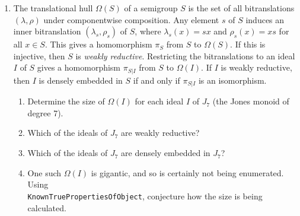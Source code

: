 \documentclass{article}
\begin{document}
\begin{enumerate}
    \item
      The translational hull $\Omega(S)$ of a semigroup $S$ is the set of all bitranslations $(\lambda, \rho)$
      under componentwise composition. Any element $s$ of $S$ induces an inner bitranslation $(\lambda_s, \rho_s)$ of $S$, where
      $\lambda_s(x) = sx$ and $\rho_s(x) = xs$ for all $x \in S$.
      This gives a homomorphism $\pi_S$ from $S$ to $\Omega(S)$. If this is injective, then $S$ is \emph{weakly reductive}.
      Restricting the bitranslations to an ideal $I$ of $S$ gives a homomorphism $\pi_{S|I}$ from $S$ to $\Omega(I)$.
      If $I$ is weakly reductive, then $I$ is densely embedded in $S$ if and only if $\pi_{S|I}$ is an isomorphism.

      \begin{enumerate}
        \item
          Determine the size of $\Omega(I)$ for each ideal $I$ of $J_7$ (the Jones monoid of degree 7).
        \item
          Which of the ideals of $J_7$ are weakly reductive?
        \item
          Which of the ideals of $J_7$ are densely embedded in $J_7$?
        \item
          One such $\Omega(I)$ is gigantic, and so is certainly not being enumerated. Using \\ \verb|KnownTruePropertiesOfObject|,
          conjecture how the size is being calculated.
  
      \end{enumerate}
    
\end{enumerate}
\end{document}
